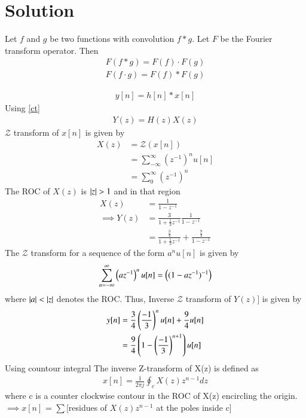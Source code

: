 \documentclass[journal,12pt,twocolumn]{IEEEtran}
\begin{document}
\section{Solution}
\begin{theorem} \label{ct}
Let $f$ and $g$ be two functions with convolution $f*g$. Let $F$ be the Fourier transform operator. Then
\begin{align}
F(f * g)=F(f) \cdot F(g)\\
F(f \cdot g)=F(f) * F(g)
\end{align}
\end{theorem}
\begin{align}
    y[n]=h[n]*x[n]
\end{align}
Using \ref{ct} 
\begin{align}
    Y(z)=H(z)X(z)
\end{align}
$\mathcal{Z}$ transform of $x[n]$ is given by
\begin{align}
    X(z)&=\mathcal{Z}(x[n])\\
    &=\sum_{-\infty}^{\infty}(z^{-1})^nu[n]\\
    &=\sum_{0}^{\infty}(z^{-1})^n
\end{align}
The ROC of $X(z)$ is $\vert z\vert>1$ and in that region
\begin{align}
    X(z)&=\frac{1}{1-z^{-1}}\\
    \implies Y(z)&=\frac{3}{1+\frac{1}{3}z^{-1}} \frac{1}{1-z^{-1}}\\
    &=\frac{\frac{3}{4}}{1+\frac{1}{3}z^{-1}}+\frac{\frac{9}{4}}{1-z^{-1}}
\end{align}
The $\mathcal{Z}$ transform for a sequence of the form $a^{n}u[n]$ is given by
\begin{align}\label{Z1}
\sum _{n=-\infty }^{\infty }\left({az^{-1}}\right)^n u[n]
=\left(({1-az^{-1}})^{-1}\right)
\end{align}
where $\vert a\vert<\vert z\vert$ denotes the ROC.
Thus, Inverse $\mathcal{Z}$ transform of $Y(z)]$ is given by
\begin{align}
    y[n]&=\frac{3}{4}\left(\frac{-1}{3}\right)^nu[n]+\frac{9}{4}u[n]\\
    &=\frac{9}{4}\left(1-\left(\frac{-1}{3}\right)^{n+1}\right)u[n]
\end{align}
Using countour integral
The inverse Z-transform of X(z) is defined as 
\begin{align}
    x[n] = \frac{1}{2\pi j} \oint_{c} X(z)z^{n-1}dz
\end{align}
where c is a counter clockwise contour in the ROC of X(z) encircling the origin. 
$\implies x[n]$ = $\sum$[residues of $X(z)z^{n-1}$ at the poles inside c]
\end{document}
